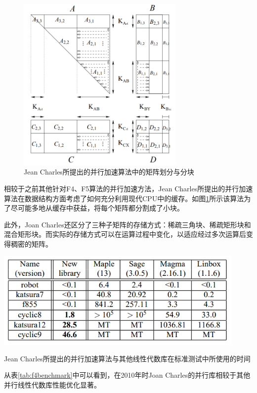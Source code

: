 \documentclass[a4paper]{article}
\begin{document}
\begin{figure}[!htbp]
    \centering
    \includegraphics[width=3.2in]{fig/screenshot-20220405-143249.png}
    \caption{Jean Charles所提出的并行加速算法中的矩阵划分与分块\cite{faugere2010parallel}}
    \label{fig:matrices_partrition}
\end{figure}

相较于之前其他针对F4、F5算法的并行加速方法，Jean Charles所提出的并行加速算法在数据结构方面考虑了如何充分利用现代CPU中的缓存。如图\ref{fig:matrices_partrition}所示该算法为了尽可能多地从缓存中获益，将每个矩阵都分割成了小块。

此外，Joan Charles还区分了三种子矩阵的存储方式：稀疏三角块、稀疏矩形块和混合矩形块。而实际的存储方式可以在运算过程中变化，以适应经过多次运算后变得稠密的矩阵。\cite{faugere2010parallel}

\begin{table}[!htbp]
    \centering
    \includegraphics[width=4.8in]{fig/f4time.png}
    \caption{Jean Charles所提出的并行加速算法与其他线性代数库在标准测试中所使用的时间\cite{faugere2010parallel}}
    \label{tab:f4benchmark}
\end{table}

从表\ref{tab:f4benchmark}中可以看到，在2010年时Joan Charles的并行库相较于其他并行线性代数库性能优化显著。
\end{document}
